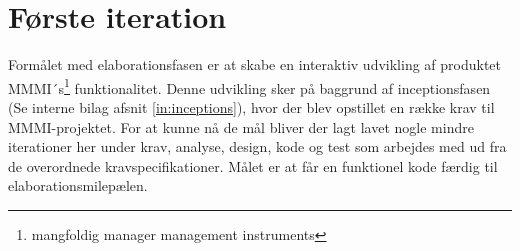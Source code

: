 \section{Første iteration}

Formålet med elaborationsfasen er at skabe en interaktiv udvikling af produktet MMMI´s\footnote{{mangfoldig manager management instruments}} funktionalitet. Denne udvikling sker på baggrund af inceptionsfasen (Se interne bilag afsnit \ref{in:inceptions}), hvor der blev opstillet en række krav til MMMI-projektet.  For at kunne nå de mål bliver der lagt lavet nogle mindre iterationer her under krav, analyse, design, kode og test som arbejdes med ud fra de overordnede kravspecifikationer. Målet er at får en funktionel kode færdig til elaborationsmilepælen. 










